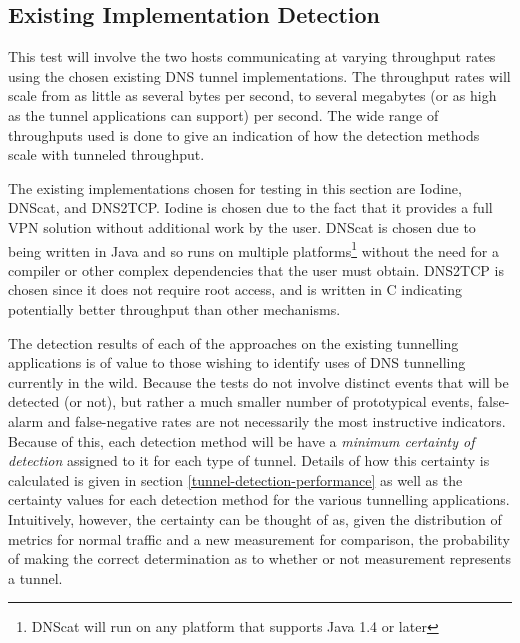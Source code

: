 \documentclass[12pt]{report}
\theoremstyle{remark}
\theoremstyle{definition}
\theoremstyle{definition}
\theoremstyle{definition}
\begin{document}

\subsection{Existing Implementation Detection}
\label{test-existing}
This test will involve the two hosts communicating at varying throughput rates
using the chosen existing DNS tunnel implementations. The throughput rates will scale
from as little as several bytes per second, to several megabytes (or as high as
the tunnel applications can support) per second. The wide range of throughputs
used is done to give an indication of how the detection methods scale with
tunneled throughput.

The existing implementations chosen for testing in this section are
Iodine\cite{iodinesrc}, DNScat\cite{dnscatsrc}, and DNS2TCP\cite{dns2tcpsrc}.
Iodine is chosen due to the fact that it provides a full VPN solution without
additional work by the user. DNScat is chosen due to being written in Java and
so runs on multiple platforms\footnote{DNScat will run on any platform that
supports Java 1.4 or later\cite{dnscatsrc}} without the need for a compiler or
other complex dependencies that the user must obtain. DNS2TCP is chosen since it
does not require root access, and is written in C indicating potentially better
throughput than other mechanisms.

The detection results of each of the approaches on the existing tunnelling
applications is of value to those wishing to identify uses of DNS tunnelling
currently in the wild. Because the tests do not involve distinct events that
will be detected (or not), but rather a much smaller number of prototypical
events, false-alarm and false-negative rates are not necessarily the most
instructive indicators. Because of this, each detection method will be have a
\emph{minimum certainty of detection} assigned to it for each type of tunnel.
Details of how this certainty is calculated is given in section
\ref{tunnel-detection-performance} as well as the certainty values for each
detection method for the various tunnelling applications. Intuitively, however,
the certainty can be thought of as, given the distribution of metrics for normal
traffic and a new measurement for comparison, the probability of making the
correct determination as to whether or not measurement represents a tunnel.
\end{document}
